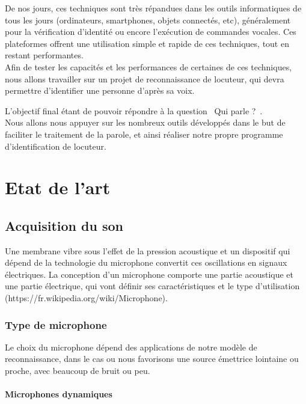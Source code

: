 \documentclass[a4paper, 12pt]{book}
\newcounter{program}[subsection]
\begin{document}
De nos jours, ces techniques sont très répandues dans les outils informatiques de tous les jours (ordinateurs, smartphones, objets connectés, etc), généralement pour la vérification d'identité ou encore l'exécution de commandes vocales. Ces plateformes offrent une utilisation simple et rapide de ces techniques, tout en restant performantes.\\

Afin de tester les capacités et les performances de certaines de ces techniques, nous allons travailler sur un projet de reconnaissance de locuteur, qui devra permettre d'identifier une personne d'après sa voix.

L'objectif final étant de pouvoir répondre à la question \guillemotleft{}~Qui parle ?~\guillemotright{}.\\

Nous allons nous appuyer sur les nombreux outils développés dans le but de faciliter le traitement de la parole, et ainsi réaliser notre propre programme d'identification de locuteur.


\chapter{Etat de l'art}

\section{Acquisition du son}

Une membrane vibre sous l'effet de la pression acoustique et un dispositif qui dépend de la technologie du microphone convertit ces oscillations en signaux électriques. La conception d'un microphone comporte une partie acoustique et une partie électrique, qui vont définir ses caractéristiques et le type d'utilisation (https://fr.wikipedia.org/wiki/Microphone).

\subsection{Type de microphone}

Le choix du microphone dépend des applications de notre modèle de reconnaissance, dans le cas ou nous favorisons une source émettrice lointaine ou proche, avec beaucoup de bruit ou peu. 


\subsubsection{Microphones dynamiques}
\end{document}
